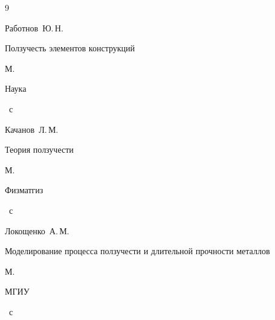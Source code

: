\begin{thebibliography}{9}


\by Работнов~Ю.\,Н.

\book Ползучесть элементов конструкций

\publaddr М.

\publ Наука


~с




\by Качанов~Л.\,М.

\book Теория ползучести

\publaddr М.

\publ Физматгиз


~с




\by  Локощенко~А.\,М.

\book Моделирование процесса ползучести и длительной прочности металлов

\publaddr М.

\publ МГИУ


~с



\end{thebibliography}





\makeengtitle



% 

